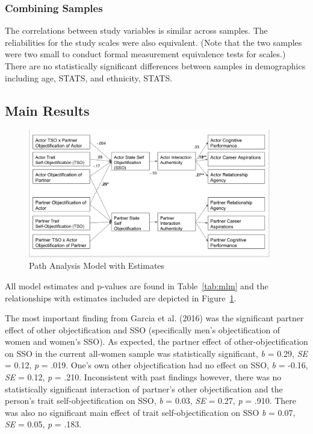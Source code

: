 \documentclass[man]{apa6}
\begin{document}
\subsubsection{Combining Samples}\label{combining-samples}

The correlations between study variables is similar across samples. The
reliabilities for the study scales were also equivalent. (Note that the
two samples were two small to conduct formal measurement equivalence
tests for scales.) There are no statistically significant differences
between samples in demographics including age, STATS, and ethnicity,
STATS.

\subsection{Main Results}\label{main-results}

\begin{figure}
\includegraphics[width=400px]{SEMfigure} \caption{Path Analysis Model with Estimates}\label{fig:semfigure}
\end{figure}

All model estimates and p-values are found in Table~\ref{tab:mlm} and
the relationships with estimates included are depicted in
Figure~\ref{fig:semfigure}.

The most important finding from Garcia et al. (2016) was the significant
partner effect of other objectification and SSO (specifically men's
objectification of women and women's SSO). As expected, the partner
effect of other-objectification on SSO in the current all-women sample
was statistically significant, \emph{b} = 0.29, \emph{SE} = 0.12,
\emph{p} = .019. One's own other objectification had no effect on SSO,
\emph{b} = -0.16, \emph{SE} = 0.12, \emph{p} = .210. Inconsistent with
past findings however, there was no statistically significant
interaction of partner's other objectification and the person's trait
self-objectification on SSO, \emph{b} = 0.03, \emph{SE} = 0.27, \emph{p}
= .910. There was also no significant main effect of trait
self-objectification on SSO \emph{b} = 0.07, \emph{SE} = 0.05, \emph{p}
= .183.
\end{document}
